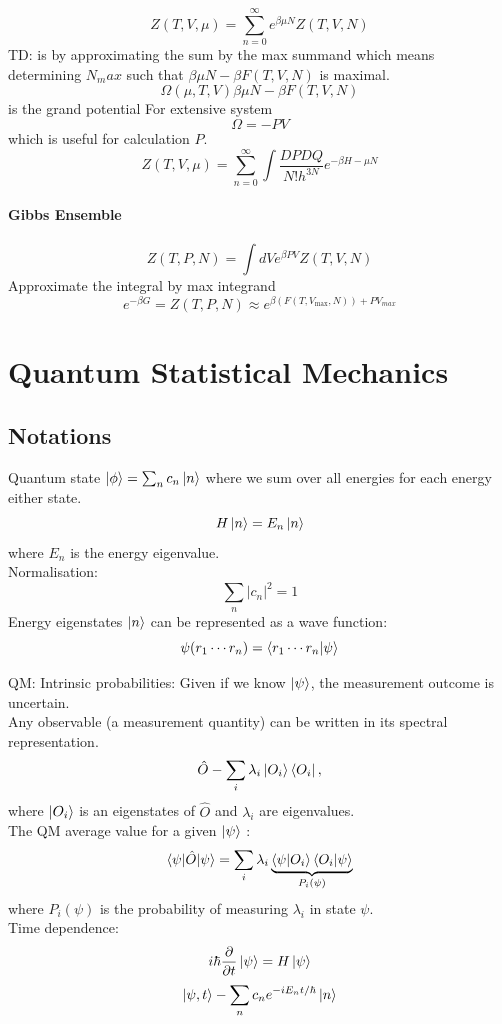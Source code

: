 \documentclass[11pt]{book}
\theoremstyle{definition}
\begin{document}
\[ Z(T,V,\mu) = \sum_{n=0}^{\infty} e^{\beta \mu N} Z(T,V,N) \] 
TD: is by approximating the sum by the max summand which means determining $ N_max $ such that $ \beta \mu N - \beta F(T,V,N) $ is maximal.
\[ \Omega(\mu, T, V)\beta \mu N - \beta F(T,V,N)  \] is the grand potential 
For extensive system
\[ \Omega = - PV \] 
which is useful for calculation $ P $.
\[ Z(T,V,\mu) = \sum_{n=0}^{\infty} \int \frac{DPDQ}{N!h^{3N}}e^{-\beta{H-\mu N}}\] 

\subsubsection{Gibbs Ensemble}%
\[ Z(T,P,N) = \int dV e^{\beta PV} Z(T,V,N)\] 
Approximate the integral by max integrand
\[ e^{-\beta G} =  Z(T,P,N) \approx e^{\beta (F(T,V_{\max}, N)) + PV_{max}} \]

\chapter{Quantum Statistical Mechanics}
\section*{Notations}
Quantum state $ \ket{\phi} = \sum_{n} c_n \ket{n} $
where we sum over all energies for each energy either state.
\[ H\ket{n} = E_n\ket{n} \] 
where $ E_n $ is the energy eigenvalue. \\
Normalisation:
\[ \sum_{n} |c_n|^2 = 1\] 
Energy eigenstates $ \ket{n} $ can be represented as a wave function:
\[ \psi(r_1 \cdots r_n) = \braket{r_1 \cdots r_n | \psi} \] 

QM: Intrinsic probabilities: Given if we know $ \ket{\psi} $, the measurement outcome is uncertain. \\
Any observable (a measurement quantity) can be written in its spectral representation.
\[ \hat O - \sum_{i} \lambda_i \ket{O_i}\bra{O_i}, \] where $ \ket{O_i} $ is an eigenstates of $ \hat O $ and $ \lambda_i $ are eigenvalues.\\

The QM average value for a given $ \ket{\psi} $ :
\[ \braket{\psi|\hat O|\psi} = \sum_i \lambda_i 
\underbrace{\braket{\psi|O_i} \braket{O_i|\psi}}_{P_i(\psi)}\] 
where $ P_i(\psi) $ is the probability of measuring $ \lambda_i $ in state $ \psi $.\\

Time dependence:
\[ i \hbar \frac{\partial }{\partial t} \ket{\psi} = H \ket{\psi}  \] 
\[ \ket{\psi,t} - \sum_{n} c_n e^{-iE_nt/\hbar} \ket{n} \] 
\end{document}
